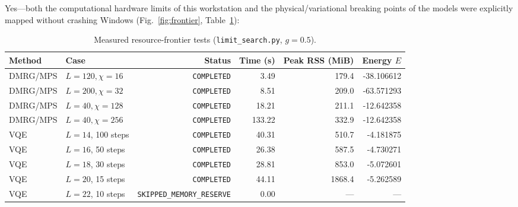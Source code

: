 \documentclass[11pt,a4paper]{article}
\begin{document}
Yes---both the computational hardware limits of this workstation and the physical/variational breaking points of the models were explicitly mapped without crashing Windows (Fig.~\ref{fig:frontier}, Table~\ref{tab:frontier}):

\begin{table}[H]\centering
\caption{Measured resource-frontier tests (\texttt{limit\_search.py}, $g=0.5$).}
\label{tab:frontier}
\begin{tabular}{llrrrr}\toprule
Method & Case & Status & Time (s) & Peak RSS (MiB) & Energy $E$ \\\midrule
DMRG/MPS & $L=120, \chi=16$ & \texttt{COMPLETED} & 3.49 & 179.4 & -38.106612 \\
DMRG/MPS & $L=200, \chi=32$ & \texttt{COMPLETED} & 8.51 & 209.0 & -63.571293 \\
DMRG/MPS & $L=40, \chi=128$ & \texttt{COMPLETED} & 18.21 & 211.1 & -12.642358 \\
DMRG/MPS & $L=40, \chi=256$ & \texttt{COMPLETED} & 133.22 & 332.9 & -12.642358 \\
VQE & $L=14$, 100 steps & \texttt{COMPLETED} & 40.31 & 510.7 & -4.181875 \\
VQE & $L=16$, 50 steps & \texttt{COMPLETED} & 26.38 & 587.5 & -4.730271 \\
VQE & $L=18$, 30 steps & \texttt{COMPLETED} & 28.81 & 853.0 & -5.072601 \\
VQE & $L=20$, 15 steps & \texttt{COMPLETED} & 44.11 & 1868.4 & -5.262589 \\
VQE & $L=22$, 10 steps & \texttt{SKIPPED\_MEMORY\_RESERVE} & 0.00 & --- & --- \\
\bottomrule
\end{tabular}
\end{table}
\end{document}
